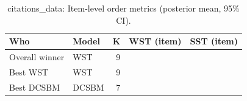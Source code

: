 \begin{table}[!h]
\centering
\caption{citations_data: Item-level order metrics (posterior mean, 95\% CI).\\\label{tab:app-citations_data-best-item-families}}
\centering
\begin{tabular}[t]{llrrr}
\toprule
Who & Model & K & WST (item) & SST (item)\\
\midrule
Overall winner & WST & 9 &  & \\
Best WST & WST & 9 &  & \\
Best DCSBM & DCSBM & 7 &  & \\
\bottomrule
\end{tabular}
\end{table}

